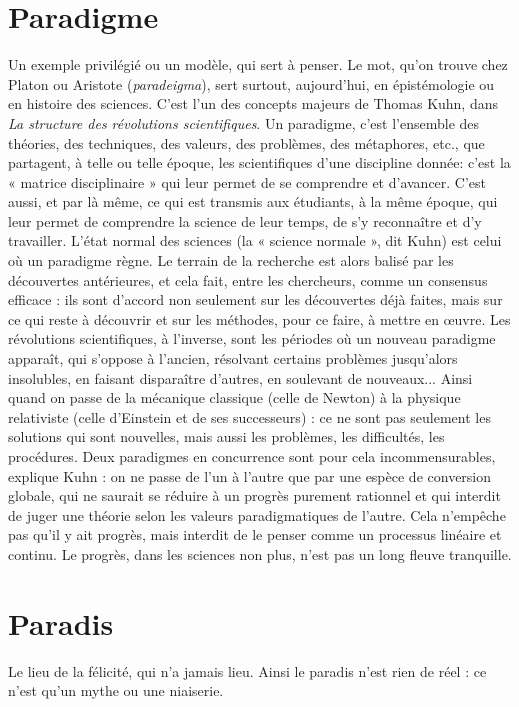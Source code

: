 \section{Paradigme}
Un exemple privilégié ou un modèle, qui sert à penser. Le mot,
qu’on trouve chez Platon ou Aristote ({\it paradeigma}), sert surtout,
aujourd’hui, en épistémologie ou en histoire des sciences. C’est l’un des
concepts majeurs de Thomas Kuhn, dans {\it La structure des révolutions scientifiques}.
Un paradigme, c’est l’ensemble des théories, des techniques, des
valeurs, des problèmes, des métaphores, etc., que partagent, à telle ou telle
époque, les scientifiques d’une discipline donnée: c’est la « matrice
disciplinaire » qui leur permet de se comprendre et d’avancer. C’est aussi, et
par là même, ce qui est transmis aux étudiants, à la même époque, qui leur
permet de comprendre la science de leur temps, de s’y reconnaître et d’y travailler.
L'état normal des sciences (la « science normale », dit Kuhn) est celui
où un paradigme règne. Le terrain de la recherche est alors balisé par les
découvertes antérieures, et cela fait, entre les chercheurs, comme un
consensus efficace : ils sont d’accord non seulement sur les découvertes déjà
faites, mais sur ce qui reste à découvrir et sur les méthodes, pour ce faire, à
mettre en œuvre. Les révolutions scientifiques, à l’inverse, sont les périodes
où un nouveau paradigme apparaît, qui s’oppose à l’ancien, résolvant certains
problèmes jusqu’alors insolubles, en faisant disparaître d’autres, en soulevant
de nouveaux... Ainsi quand on passe de la mécanique classique (celle de
Newton) à la physique relativiste (celle d’Einstein et de ses successeurs) : ce
ne sont pas seulement les solutions qui sont nouvelles, mais aussi les problèmes,
les difficultés, les procédures. Deux paradigmes en concurrence sont
pour cela incommensurables, explique Kuhn : on ne passe de l’un à l’autre
que par une espèce de conversion globale, qui ne saurait se réduire à un progrès
purement rationnel et qui interdit de juger une théorie selon les valeurs
paradigmatiques de l’autre. Cela n'empêche pas qu’il y ait progrès, mais
interdit de le penser comme un processus linéaire et continu. Le progrès,
dans les sciences non plus, n’est pas un long fleuve tranquille.

\section{Paradis}
Le lieu de la félicité, qui n’a jamais lieu. Ainsi le paradis n’est rien
de réel : ce n’est qu’un mythe ou une niaiserie.

